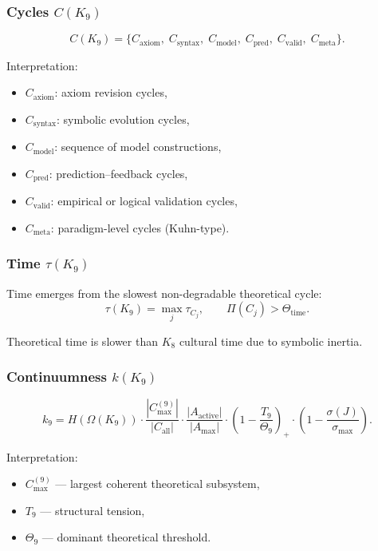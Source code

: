 \subsubsection{Cycles \texorpdfstring{$C(K_9)$}{C(K_9)}}

\[
C(K_9)=
\{
C_{\mathrm{axiom}},\;
C_{\mathrm{syntax}},\;
C_{\mathrm{model}},\;
C_{\mathrm{pred}},\;
C_{\mathrm{valid}},\;
C_{\mathrm{meta}}
\}.
\]

Interpretation:
\begin{itemize}
    \item $C_{\mathrm{axiom}}$: axiom revision cycles,
    \item $C_{\mathrm{syntax}}$: symbolic evolution cycles,
    \item $C_{\mathrm{model}}$: sequence of model constructions,
    \item $C_{\mathrm{pred}}$: prediction–feedback cycles,
    \item $C_{\mathrm{valid}}$: empirical or logical validation cycles,
    \item $C_{\mathrm{meta}}$: paradigm-level cycles (Kuhn-type).
\end{itemize}

\subsubsection{Time \texorpdfstring{$\tau(K_9)$}{\tau(K_9)}}

Time emerges from the slowest non-degradable theoretical cycle:
\[
\tau(K_9)=\max_j \tau_{C_j},
\qquad
\Pi(C_j) > \Theta_{\mathrm{time}}.
\]

Theoretical time is slower than $K_8$ cultural time due to symbolic inertia.

\subsubsection{Continuumness \texorpdfstring{$k(K_9)$}{k(K_9)}}

\[
k_9 =
H(\Omega(K_9))
\cdot
\frac{|C_{\max}^{(9)}|}{|C_{\mathrm{all}}|}
\cdot
\frac{|A_{\mathrm{active}}|}{|A_{\max}|}
\cdot
\left(1-\frac{T_9}{\Theta_9}\right)_+
\cdot
\left(1-\frac{\sigma(J)}{\sigma_{\max}}\right).
\]

Interpretation:
\begin{itemize}
    \item $C_{\max}^{(9)}$ — largest coherent theoretical subsystem,
    \item $T_9$ — structural tension,
    \item $\Theta_9$ — dominant theoretical threshold.
\end{itemize}

